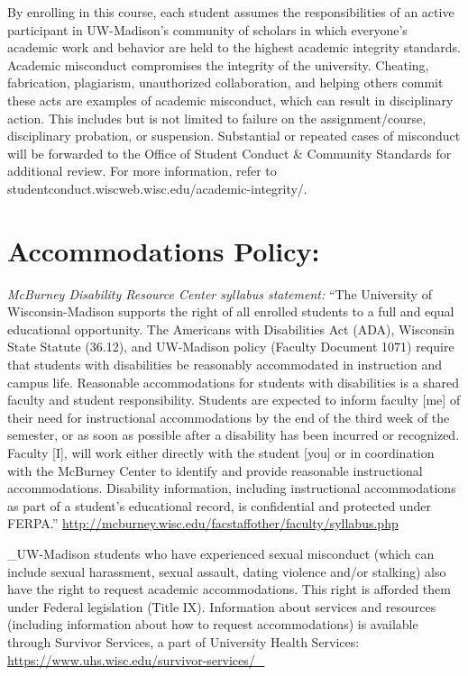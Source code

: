 \documentclass[11pt,man]{article}
\begin{document}
By enrolling in this course, each student assumes the responsibilities
of an active participant in UW-Madison's community of scholars in which
everyone's academic work and behavior are held to the highest academic
integrity standards. Academic misconduct compromises the integrity of
the university. Cheating, fabrication, plagiarism, unauthorized
collaboration, and helping others commit these acts are examples of
academic misconduct, which can result in disciplinary action. This
includes but is not limited to failure on the assignment/course,
disciplinary probation, or suspension. Substantial or repeated cases of
misconduct will be forwarded to the Office of Student Conduct \&
Community Standards for additional review. For more information, refer
to studentconduct.wiscweb.wisc.edu/academic-integrity/.

\hypertarget{accommodations-policy}{%
\section{Accommodations Policy:}\label{accommodations-policy}}

\emph{McBurney Disability Resource Center syllabus statement:} ``The
University of Wisconsin-Madison supports the right of all enrolled
students to a full and equal educational opportunity. The Americans with
Disabilities Act (ADA), Wisconsin State Statute (36.12), and UW-Madison
policy (Faculty Document 1071) require that students with disabilities
be reasonably accommodated in instruction and campus life. Reasonable
accommodations for students with disabilities is a shared faculty and
student responsibility. Students are expected to inform faculty {[}me{]}
of their need for instructional accommodations by the end of the third
week of the semester, or as soon as possible after a disability has been
incurred or recognized. Faculty {[}I{]}, will work either directly with
the student {[}you{]} or in coordination with the McBurney Center to
identify and provide reasonable instructional accommodations. Disability
information, including instructional accommodations as part of a
student's educational record, is confidential and protected under
FERPA.''
\url{http://mcburney.wisc.edu/facstaffother/faculty/syllabus.php}

\_UW-Madison students who have experienced sexual misconduct (which can
include sexual harassment, sexual assault, dating violence and/or
stalking) also have the right to request academic accommodations. This
right is afforded them under Federal legislation (Title IX). Information
about services and resources (including information about how to request
accommodations) is available through Survivor Services, a part of
University Health Services:
\url{https://www.uhs.wisc.edu/survivor-services/_}
\end{document}
